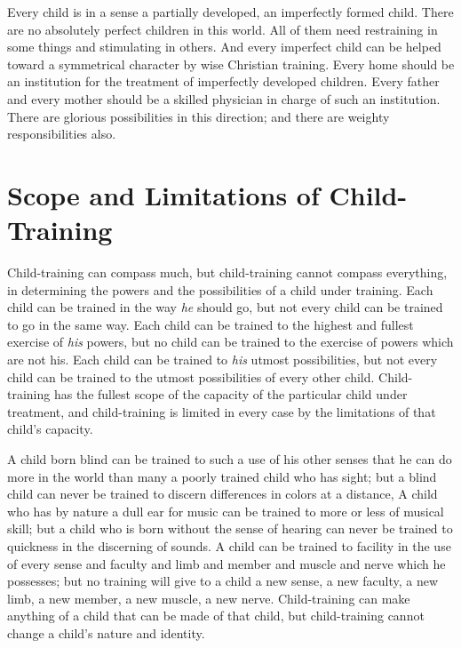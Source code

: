 \documentclass[
]{book}
\begin{document}
Every child is in a sense a partially developed, an imperfectly formed child. There are no absolutely perfect children in this world. All of them need restraining in some things and stimulating in others. And every imperfect child can be helped toward a symmetrical character by wise Christian training. Every home should be an institution for the treatment of imperfectly developed children. Every father and every mother should be a skilled physician in charge of such an institution. There are glorious possibilities in this direction; and there are weighty responsibilities also.

\hypertarget{scope-and-limitations-of-child-training}{%
\chapter{Scope and Limitations of Child-Training}\label{scope-and-limitations-of-child-training}}

Child-training can compass much, but child-training cannot compass everything, in determining the powers and the possibilities of a child under training. Each child can be trained in the way \emph{he} should go, but not every child can be trained to go in the same way. Each child can be trained to the highest and fullest exercise of \emph{his} powers, but no child can be trained to the exercise of powers which are not his. Each child can be trained to \emph{his} utmost possibilities, but not every child can be trained to the utmost possibilities of every other child. Child-training has the fullest scope of the capacity of the particular child under treatment, and child-training is limited in every case by the limitations of that child's capacity.

A child born blind can be trained to such a use of his other senses that he can do more in the world than many a poorly trained child who has sight; but a blind child can never be trained to discern differences in colors at a distance, A child who has by nature a dull ear for music can be trained to more or less of musical skill; but a child who is born without the sense of hearing can never be trained to quickness in the discerning of sounds. A child can be trained to facility in the use of every sense and faculty and limb and member and muscle and nerve which he possesses; but no training will give to a child a new sense, a new faculty, a new limb, a new member, a new muscle, a new nerve. Child-training can make anything of a child that can be made of that child, but child-training cannot change a child's nature and identity.
\end{document}
